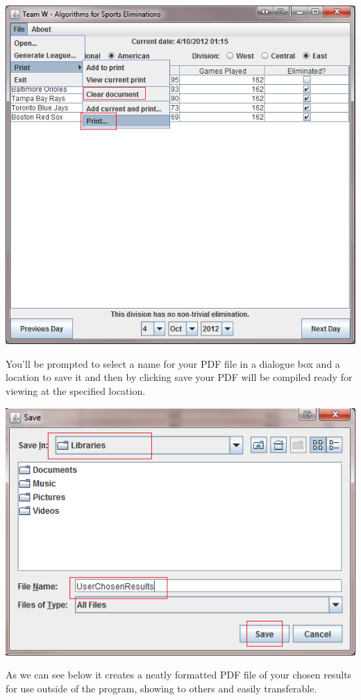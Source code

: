 \includegraphics[width=\linewidth,keepaspectratio]{images/userManualDesk13.png}

You'll be prompted to select a name for your PDF file in a dialogue box and a
location to save it and then by clicking save your PDF will be compiled ready
for viewing at the specified location.

\includegraphics[width=\linewidth,keepaspectratio]{images/userManualDesk14.png}

As we can see below it creates a neatly formatted PDF file of your chosen
results for use outside of the program, showing to others and easily
transferable.

